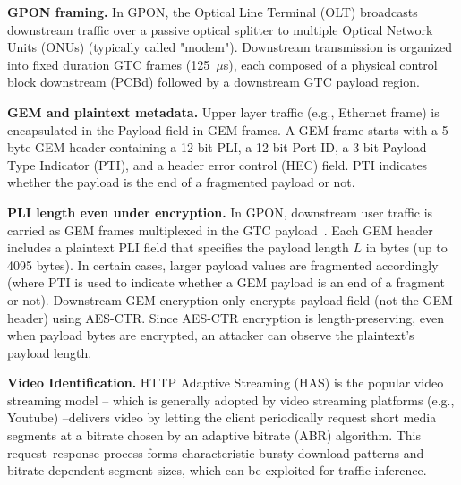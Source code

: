 \documentclass[sigconf]{acmart}
\begin{document}
\noindent\textbf{GPON framing.}
In GPON, the Optical Line Terminal (OLT) broadcasts downstream traffic over a passive optical splitter to multiple Optical Network Units (ONUs) (typically called "modem"). Downstream transmission is organized into fixed duration GTC frames (125~$\mu$s), each composed of a physical control block downstream (PCBd) followed by a downstream GTC payload region.
~\cite{itu-g9843} %

\noindent\textbf{GEM and plaintext metadata.}
Upper layer traffic (e.g., Ethernet frame) is encapsulated in the Payload field in GEM frames. A GEM frame starts with a 5-byte GEM header containing a 12-bit PLI, a 12-bit Port-ID, a 3-bit Payload Type Indicator (PTI), and a header error control (HEC) field. PTI indicates whether the payload is the end of a fragmented payload or not. %
~\cite{itu-g9843} %

\noindent\textbf{PLI length even under encryption.}
In GPON, downstream user traffic is carried as GEM frames multiplexed in the GTC payload~\cite{itu-g9843}.
Each GEM header includes a plaintext PLI field that specifies the payload length $L$ in bytes (up to 4095 bytes). In certain cases, larger payload values are fragmented accordingly~\cite{itu-g9843} (where PTI is used to indicate whether a GEM payload is an end of a fragment or not).
Downstream GEM encryption only encrypts payload field (not the GEM header) using AES-CTR.
Since AES-CTR encryption is length-preserving, even when payload bytes are encrypted, an attacker can observe the plaintext's payload length.

\noindent\textbf{Video Identification.} HTTP Adaptive Streaming (HAS) is the popular video streaming model -- which is generally adopted by video streaming platforms (e.g., Youtube) --delivers video by letting the client periodically request short media segments at a bitrate chosen by an adaptive bitrate (ABR) algorithm. This request--response process forms characteristic bursty download patterns and bitrate-dependent segment sizes, which can be exploited for traffic inference.~\cite{bae-sec22}
\end{document}
